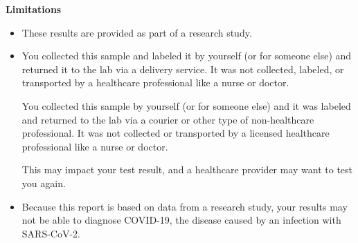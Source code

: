 \documentclass[10pt]{article}
\begin{document}
\textbf{Limitations}

\begin{itemize}

\item

  These results are provided as part of a research study.

\item
  You collected this sample and labeled it by yourself (or for someone else) and
  returned it to the lab via a delivery service. It was not collected, labeled,
  or transported by a healthcare professional like a nurse or doctor.

  You collected this sample by yourself (or for someone else) and it was labeled
  and returned to the lab via a courier or other type of non-healthcare
  professional. It was not collected or transported by a licensed healthcare
  professional like a nurse or doctor.



  This may impact your test result, and a healthcare provider may want to test
  you again.

\item

  Because this report is based on data from a research study, your results may
  not be able to diagnose COVID-19, the disease caused by an infection with
  SARS-CoV-2.

\end{itemize}
\end{document}
